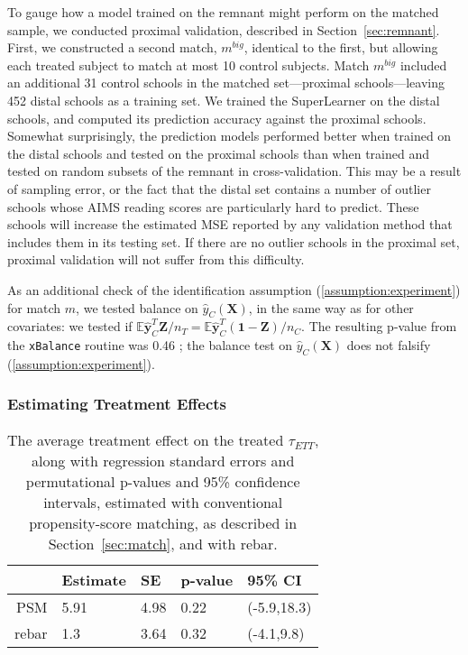 \documentclass[12pt]{article}\usepackage[]{graphicx}\usepackage[]{color}
\newcommand{\EE}{\mathbb{E}}
\newcommand{\match}{m}
\newcommand{\covMat}{\bm{X}}
\begin{document}
To gauge how a model trained on the remnant might perform on the matched sample, we conducted proximal validation, described in Section~\ref{sec:remnant}.
First, we constructed a second match, $\match^{big}$, identical to the first, but allowing each treated subject to match at most 10 control subjects.
Match $\match^{big}$ included an additional
31 control schools in the
matched set---proximal schools---leaving 452 distal schools as a training set.
We trained the SuperLearner on the distal schools, and computed its
prediction accuracy against the proximal schools.
Somewhat surprisingly, the prediction models performed better when
trained on the distal schools and tested on the proximal schools than
when trained and tested on random subsets of the remnant in cross-validation.
This may be a result of sampling error, or the fact that the distal set contains a number of outlier schools whose AIMS reading scores are particularly hard to predict.
These schools will increase the estimated MSE reported by any validation method that includes them in its testing set.
If there are no outlier schools in the proximal set, proximal validation will not suffer from this difficulty.

As an additional check of the identification assumption (\ref{assumption:experiment}) for match $\match$, we tested balance on $\hat{y}_C(\covMat)$, in the same way as for other covariates: we tested if $\EE \bm{\hat{y}}_C^T\bm{Z}/n_T=\EE \bm{\hat{y}}_C^T(\bm{1}-\bm{Z})/n_C$.
The resulting p-value from the \verb|xBalance| routine was
0.46%
; the balance test on $\hat{y}_C(\covMat)$ does not falsify (\ref{assumption:experiment}).

\subsubsection{Estimating Treatment Effects}




\begin{table}[ht]
\centering
\begin{tabular}{rllll}
  \hline
 & Estimate & SE & p-value & 95\% CI \\ 
  \hline
PSM & 5.91 & 4.98 & 0.22 & (-5.9,18.3) \\ 
  rebar & 1.3 & 3.64 & 0.32 & (-4.1,9.8) \\ 
   \hline
\end{tabular}
\caption{The average treatment effect on the treated $\tau_{ETT}$, along with regression standard errors and permutational p-values and 95\%
confidence intervals, estimated with conventional propensity-score matching, as described in Section~\ref{sec:match}, and with rebar.} 
\label{table:results}
\end{table}
\end{document}
